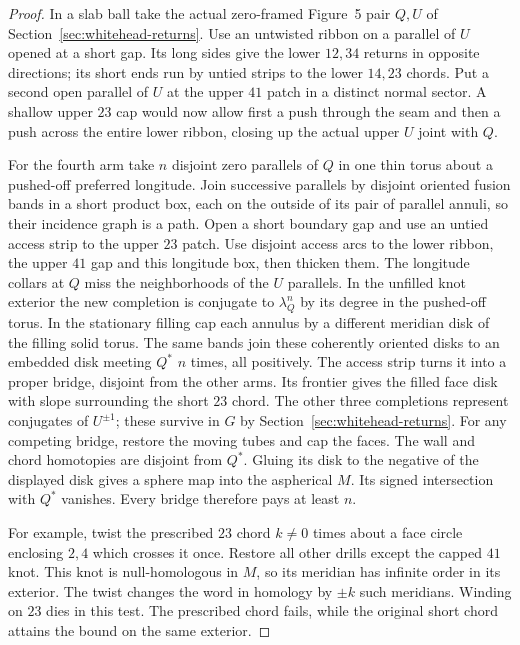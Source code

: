 \documentclass[11pt,letterpaper]{article}
\numberwithin{equation}{section}
\theoremstyle{remark}
\begin{document}
\begin{proof}
In a slab ball take the actual zero-framed Figure~5 pair \(Q,U\) of
Section~\ref{sec:whitehead-returns}. Use an untwisted ribbon on a
parallel of \(U\) opened at a short gap. Its long sides give the lower
\(12,34\) returns in opposite directions; its short ends run by
untied strips to the lower \(14,23\) chords. Put a second open
parallel of \(U\) at the upper \(41\) patch in a distinct normal
sector. A shallow upper \(23\) cap would now allow first a push through
the seam and then a push across the entire lower ribbon, closing up
the actual upper \(U\) joint with \(Q\).

For the fourth arm take \(n\) disjoint zero parallels of \(Q\) in
one thin torus about a pushed-off preferred longitude. Join successive
parallels by disjoint oriented fusion bands in a short product box,
each on the outside of its pair of parallel annuli, so their incidence
graph is a path. Open a short boundary gap and use an untied access
strip to the upper \(23\) patch. Use disjoint access arcs to the lower
ribbon, the upper \(41\) gap and this longitude box, then thicken them.
The longitude collars at \(Q\) miss the neighborhoods of the \(U\)
parallels. In the unfilled knot exterior the new completion is conjugate
to \(\lambda_Q^n\) by its degree in the pushed-off torus.
In the stationary filling cap each annulus by a different meridian
disk of the filling solid torus. The same bands join these coherently
oriented disks to an embedded disk meeting \(Q^*\) \(n\) times,
all positively. The access strip turns it into a proper bridge,
disjoint from the other arms. Its frontier gives the filled face disk
with slope surrounding the short \(23\) chord. The other three
completions represent conjugates of \(U^{\pm1}\); these survive in
\(G\) by Section~\ref{sec:whitehead-returns}. For any competing
bridge, restore the moving tubes and cap the faces. The wall and
chord homotopies are disjoint from \(Q^*\). Gluing its disk to
the negative of the displayed disk gives a sphere map into the
aspherical \(M\). Its signed intersection with \(Q^*\) vanishes.
Every bridge therefore pays at least \(n\).

For example, twist the prescribed \(23\) chord \(k\ne0\) times about
a face circle enclosing \(2,4\) which crosses it once. Restore all
other drills except the capped \(41\) knot. This knot is null-homologous
in \(M\), so its meridian has infinite order in its exterior.
The twist changes the word in homology by \(\pm k\) such meridians.
Winding on \(23\) dies in this test. The prescribed chord fails, while
the original short chord attains the bound on the same exterior.


\end{proof}
\end{document}
